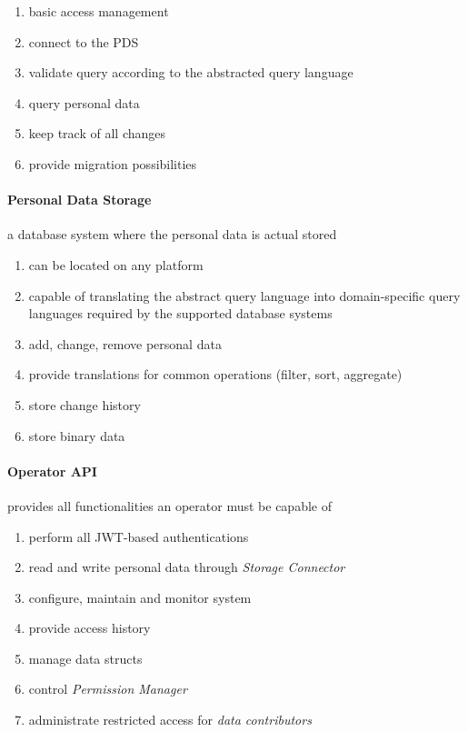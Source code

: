 \documentclass[12pt,english,a4paper,titlepage,cleardoublepage=empty,dottedtoc]{report}
\providecommand{\tightlist}{%
  \setlength{\itemsep}{0pt}\setlength{\parskip}{0pt}}
\begin{document}
\begin{enumerate}
\def\labelenumi{\alph{enumi})}
\tightlist
\item
  basic access management
\item
  connect to the PDS
\item
  validate query according to the abstracted query language
\item
  query personal data
\item
  keep track of all changes
\item
  provide migration possibilities
\end{enumerate}

\paragraph{Personal Data Storage}\label{personal-data-storage}

a database system where the personal data is actual stored

\begin{enumerate}
\def\labelenumi{\alph{enumi})}
\tightlist
\item
  can be located on any platform
\item
  capable of translating the abstract query language into
  domain-specific query languages required by the supported database
  systems
\item
  add, change, remove personal data
\item
  provide translations for common operations (filter, sort, aggregate)
\item
  store change history
\item
  store binary data
\end{enumerate}

\paragraph{Operator API}\label{operator-api}

provides all functionalities an operator must be capable of

\begin{enumerate}
\def\labelenumi{\alph{enumi})}
\tightlist
\item
  perform all JWT-based authentications
\item
  read and write personal data through \emph{Storage Connector}
\item
  configure, maintain and monitor system
\item
  provide access history
\item
  manage data structs
\item
  control \emph{Permission Manager}
\item
  administrate restricted access for \emph{data contributors}
\end{enumerate}
\end{document}
